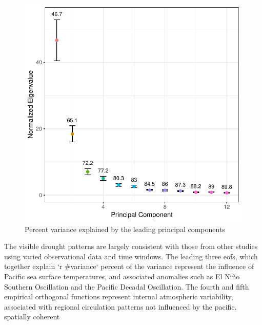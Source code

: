 \documentclass[fleqn,10pt]{wlscirep}
\begin{document}
\begin{figure}[ht]
\centering
\includegraphics[width=\linewidth]{figures/variance_explained.pdf}
\caption{Percent variance explained by the leading principal components}
\label{fig:variance-explained}
\end{figure}

The visible drought patterns are largely consistent with those from other studies using varied observational data and time windows. The leading three eofs, which together explain `r #variance` percent of the variance represent the influence of Pacific sea surface temperatures, and associated anomalies such as El Ni\~no Southern Oscillation and the Pacific Decadal Oscillation. The fourth and fifth empirical orthogonal functions represent internal atmospheric variability, associated with regional circulation patterns not influenced by the pacific. spatially coherent
\end{document}
